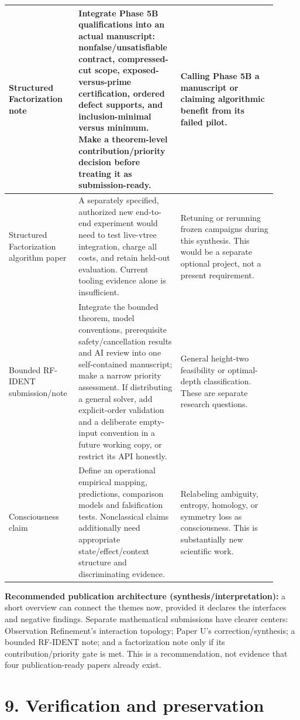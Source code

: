 \documentclass[10pt,letterpaper]{article}
\begin{document}
\begin{longtable}{@{}P{0.210\linewidth}P{0.348\linewidth}P{0.348\linewidth}@{}}
Structured Factorization note & Integrate Phase 5B qualifications into an actual manuscript: nonfalse/unsatisfiable contract, compressed-cut scope, exposed-versus-prime certification, ordered defect supports, and inclusion-minimal versus minimum. Make a theorem-level contribution/priority decision before treating it as submission-ready. & Calling Phase 5B a manuscript or claiming algorithmic benefit from its failed pilot. \\ \hline
Structured Factorization algorithm paper & A separately specified, authorized new end-to-end experiment would need to test live-vtree integration, charge all costs, and retain held-out evaluation. Current tooling evidence alone is insufficient. & Retuning or rerunning frozen campaigns during this synthesis. This would be a separate optional project, not a present requirement. \\ \hline
Bounded RF-IDENT submission/note & Integrate the bounded theorem, model conventions, prerequisite safety/cancellation results and AI review into one self-contained manuscript; make a narrow priority assessment. If distributing a general solver, add explicit-order validation and a deliberate empty-input convention in a future working copy, or restrict its API honestly. & General height-two feasibility or optimal-depth classification. These are separate research questions. \\ \hline
Consciousness claim & Define an operational empirical mapping, predictions, comparison models and falsification tests. Nonclassical claims additionally need appropriate state/effect/context structure and discriminating evidence. & Relabeling ambiguity, entropy, homology, or symmetry loss as consciousness. This is substantially new scientific work. \\ \hline
\end{longtable}
\endgroup


\textbf{Recommended publication architecture (synthesis/interpretation):} a short overview can connect the themes now, provided it declares the interfaces and negative findings. Separate mathematical submissions have clearer centers: Observation Refinement's interaction topology; Paper U's correction/synthesis; a bounded RF-IDENT note; and a factorization note only if its contribution/priority gate is met. This is a recommendation, not evidence that four publication-ready papers already exist.\par

\section*{9. Verification and preservation}
\end{document}
